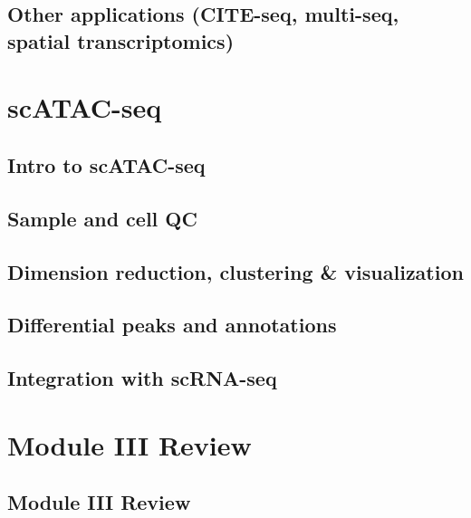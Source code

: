 \documentclass[]{book}
\begin{document}
\hypertarget{other-applications-cite-seq-multi-seq-spatial-transcriptomics}{%
\section{Other applications (CITE-seq, multi-seq, spatial transcriptomics)}\label{other-applications-cite-seq-multi-seq-spatial-transcriptomics}}

\hypertarget{scatac}{%
\chapter{scATAC-seq}\label{scatac}}

\hypertarget{intro-to-scatac-seq}{%
\section{Intro to scATAC-seq}\label{intro-to-scatac-seq}}

\hypertarget{sample-and-cell-qc}{%
\section{Sample and cell QC}\label{sample-and-cell-qc}}

\hypertarget{dimension-reduction-clustering-visualization}{%
\section{Dimension reduction, clustering \& visualization}\label{dimension-reduction-clustering-visualization}}

\hypertarget{differential-peaks-and-annotations}{%
\section{Differential peaks and annotations}\label{differential-peaks-and-annotations}}

\hypertarget{integration-with-scrna-seq}{%
\section{Integration with scRNA-seq}\label{integration-with-scrna-seq}}

\hypertarget{m3re}{%
\chapter{Module III Review}\label{m3re}}

\hypertarget{module-iii-review}{%
\section{Module III Review}\label{module-iii-review}}
\end{document}
